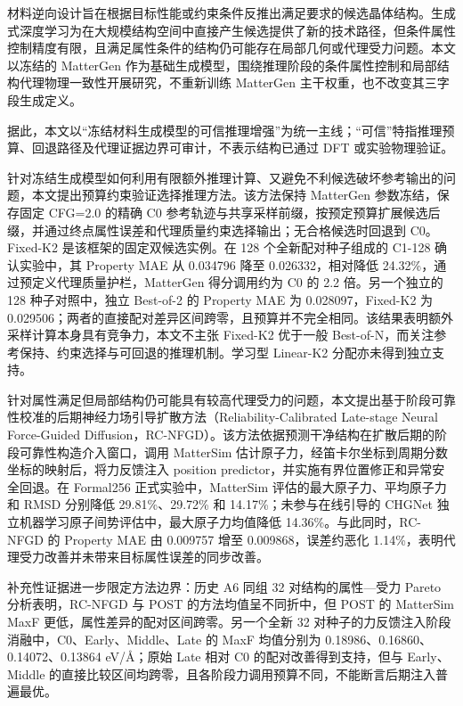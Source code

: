 \begin{ChineseAbstract}

材料逆向设计旨在根据目标性能或约束条件反推出满足要求的候选晶体结构。生成式深度学习为在大规模结构空间中直接产生候选提供了新的技术路径，但条件属性控制精度有限，且满足属性条件的结构仍可能存在局部几何或代理受力问题。本文以冻结的 MatterGen 作为基础生成模型，围绕推理阶段的条件属性控制和局部结构代理物理一致性开展研究，不重新训练 MatterGen 主干权重，也不改变其三字段生成定义。

据此，本文以“冻结材料生成模型的可信推理增强”为统一主线；“可信”特指推理预算、回退路径及代理证据边界可审计，不表示结构已通过 DFT 或实验物理验证。


针对冻结生成模型如何利用有限额外推理计算、又避免不利候选破坏参考输出的问题，本文提出预算约束验证选择推理方法。该方法保持 MatterGen 参数冻结，保存固定 CFG=2.0 的精确 C0 参考轨迹与共享采样前缀，按预定预算扩展候选后缀，并通过终点属性误差和代理质量约束选择输出；无合格候选时回退到 C0。Fixed-K2 是该框架的固定双候选实例。在 128 个全新配对种子组成的 C1-128 确认实验中，其 Property MAE 从 0.034796 降至 0.026332，相对降低 24.32\%，通过预定义代理质量护栏，MatterGen 得分调用约为 C0 的 2.2 倍。另一个独立的 128 种子对照中，独立 Best-of-2 的 Property MAE 为 0.028097，Fixed-K2 为 0.029506；两者的直接配对差异区间跨零，且预算并不完全相同。该结果表明额外采样计算本身具有竞争力，本文不主张 Fixed-K2 优于一般 Best-of-N，而关注参考保持、约束选择与可回退的推理机制。学习型 Linear-K2 分配亦未得到独立支持。

针对属性满足但局部结构仍可能具有较高代理受力的问题，本文提出基于阶段可靠性校准的后期神经力场引导扩散方法（Reliability-Calibrated Late-stage Neural Force-Guided Diffusion，RC-NFGD）。该方法依据预测干净结构在扩散后期的阶段可靠性构造介入窗口，调用 MatterSim 估计原子力，经笛卡尔坐标到周期分数坐标的映射后，将力反馈注入 position predictor，并实施有界位置修正和异常安全回退。在 Formal256 正式实验中，MatterSim 评估的最大原子力、平均原子力和 RMSD 分别降低 29.81\%、29.72\% 和 14.17\%；未参与在线引导的 CHGNet 独立机器学习原子间势评估中，最大原子力均值降低 14.36\%。与此同时，RC-NFGD 的 Property MAE 由 0.009757 增至 0.009868，误差约恶化 1.14\%，表明代理受力改善并未带来目标属性误差的同步改善。

补充性证据进一步限定方法边界：历史 A6 同组 32 对结构的属性---受力 Pareto 分析表明，RC-NFGD 与 POST 的方法均值呈不同折中，但 POST 的 MatterSim MaxF 更低，属性差异的配对区间跨零。另一个全新 32 对种子的力反馈注入阶段消融中，C0、Early、Middle、Late 的 MaxF 均值分别为 0.18986、0.16860、0.14072、0.13864 eV/\AA；原始 Late 相对 C0 的配对改善得到支持，但与 Early、Middle 的直接比较区间均跨零，且各阶段力调用预算不同，不能断言后期注入普遍最优。



\end{ChineseAbstract}

